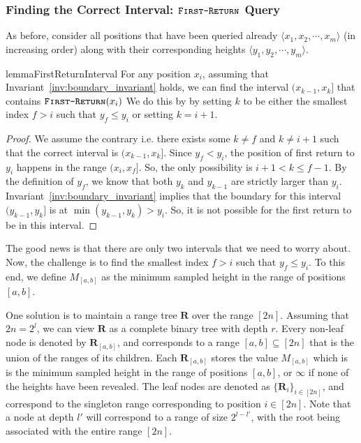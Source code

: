 \subsubsection{Finding the Correct Interval: $\texttt{\textsc{First-Return}}$ Query}
As before, consider all positions that have been queried already $ \langle x_1, x_2,\cdots, x_m \rangle$ (in increasing order)
along with their corresponding heights $ \langle y_1, y_2,\cdots, y_m \rangle$.
\begin{restatable}{lemma}{FirstReturnInterval}
\label{lem:first_return_interval}
For any position $x_i$, assuming that Invariant~\ref{inv:boundary_invariant} holds,
we can find the interval $(x_{k-1},x_{k}]$ that contains $\texttt{\textsc{First-Return}}(x_i)$
We do this by by setting $k$ to be either the smallest index $f>i$ such that $y_f\le y_i$ or setting $k=i+1$.
\end{restatable}
\begin{proof}
We assume the contrary i.e. there exists some $k\not=f$ and $k\not=i+1$ such that the correct interval is $(x_{k-1},x_k]$.
Since $y_f<y_i$, the position of first return to $y_i$ happens in the range $(x_i,x_f]$.
So, the only possibility is $i+1 < k \le f-1$.
By the definition of $y_f$, we know that both $y_k$ and $y_{k-1}$ are strictly larger than $y_i$.
Invariant~\ref{inv:boundary_invariant} implies that the boundary for this interval $(y_{k-1},y_k]$ is at $\min(y_{k-1},y_k) > y_i$.
So, it is not possible for the first return to be in this interval.
\end{proof}

The good news is that there are only two intervals that we need to worry about.
Now, the challenge is to find the smallest index $f>i$ such that $y_f\le y_i$.
To this end, we define $M_{[a,b]}$ as the minimum sampled height in the range of positions $[a,b]$.

One solution is to maintain a range tree $\mathbf R$ \cite{comp_geo} over the range $[2n]$.
Assuming that $2n = 2^l$, we can view $\mathbf R$ as a complete binary tree with depth $r$.
Every non-leaf node is denoted by $\mathbf R_{[a,b]}$, and corresponds to a range $[a,b]\subseteq[2n]$ that is the union of the ranges of its children.
Each $\mathbf R_{[a,b]}$ stores the value $M_{[a,b]}$ which is is the minimum sampled height
in the range of positions $[a,b]$, or $\infty$ if none of the heights have been revealed.
The leaf nodes are denoted as $\{\mathbf R_i\}_{i\in[2n]}$, and correspond to the singleton range corresponding to position $i\in [2n]$.
Note that a node at depth $l'$ will correspond to a range of size $2^{l-l'}$, with the root being associated with the entire range $[2n]$.


